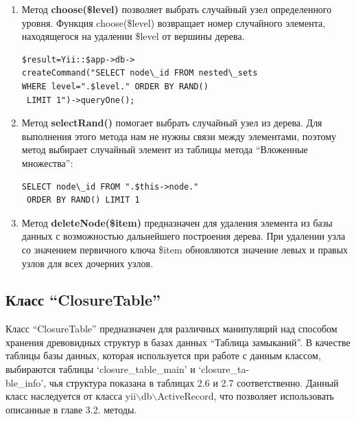 \documentclass[a4paper,14pt]{extreport}
\theoremstyle{definition}
\begin{document}
\begin{enumerate}
\begin{verbatim}$connection=$\backslash$Yii::$app->db;
       $connection->createCommand()
                   ->update('node',[
                    'node\_status'=>1,
                    ],'node\_id='.$id.'')
                   ->execute();\end{verbatim}
\item Метод \textbf{choose(\$level)} позволяет выбрать случайный узел определенного уровня. Функция choose(\$level) возвращает номер случайного элемента, находящегося на удалении \$level от вершины дерева.
\begin{verbatim}$result=Yii::$app->db->
createCommand("SELECT node\_id FROM nested\_sets
WHERE level=".$level." ORDER BY RAND()
 LIMIT 1")->queryOne();\end{verbatim}
\item Метод \textbf{selectRand()} помогает выбрать случайный узел из дерева. Для выполнения этого метода нам не нужны связи между элементами, поэтому метод выбирает случайный элемент из таблицы метода “Вложенные множества”:
\begin{verbatim}SELECT node\_id FROM ".$this->node."
 ORDER BY RAND() LIMIT 1 \end{verbatim}
\item Метод \textbf{deleteNode(\$item)} предназначен для удаления элемента из базы данных с возможностью дальнейшего построения дерева.
При удалении узла со значением первичного ключа \$item обновляются значение левых и правых узлов для всех дочерних узлов.
\end{enumerate}
\subsection{Класс “ClosureTable”}
Класс “ClosureTable” предназначен для различных манипуляций над способом хранения древовидных структур в базах данных “Таблица замыканий”. В качестве таблицы базы данных, которая используется при работе с данным классом, выбираются таблицы ‘closure\_table\_main’ и ‘closure\_ta-\\ble\_info’, чья структура показана в таблицах 2.6 и 2.7 соответственно. Данный класс наследуется от класса yii$\backslash$db$\backslash$ActiveRecord, что позволяет использовать описанные в главе 3.2. методы.
\end{document}
